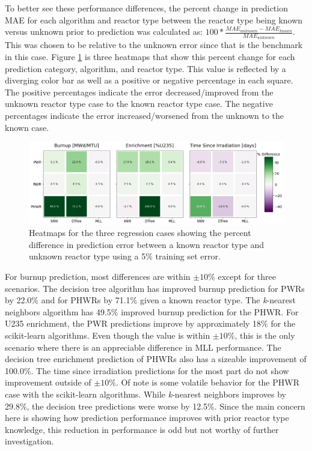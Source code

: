 To better see these performance differences, the percent change in prediction
\gls{MAE} for each algorithm and reactor type between the reactor type being
known versus unknown prior to prediction was calculated as: $100 *
\frac{MAE_{unknown} - MAE_{known}}{MAE_{unknown}}$.  This was chosen to be
relative to the unknown error since that is the benchmark in this case.  Figure
\ref{fig:knownrxtr} is three heatmaps that show this percent change for each
prediction category, algorithm, and reactor type.  This value is reflected by a
diverging color bar as well as a positive or negative percentage in each
square.  The positive percentages indicate the error decreased/improved from
the unknown reactor type case to the known reactor type case.  The negative
percentages indicate the error increased/worsened from the unknown to the known
case. 

\begin{figure}[!htb]
  \centering
  \includegraphics[width=\textwidth]{./chapters/exp1/rxtr-type_known-unknown_diff_err05.png}
  \caption{Heatmaps for the three regression cases showing the percent 
           difference in prediction error between a known reactor type 
           and unknown reactor type using a 5\% training set error.}
  \label{fig:knownrxtr}
\end{figure}

For burnup prediction, most differences are within $\pm10\%$ except for three
scenarios.  The decision tree algorithm has improved burnup prediction for
\gls{PWR}s by 22.0\% and for \gls{PHWR}s by 71.1\% given a known reactor type.
The \textit{k}-nearest neighbors algorithm has 49.5\% improved burnup
prediction for the \gls{PHWR}. For \gls{U235} enrichment, the \gls{PWR}
predictions improve by approximately 18\% for the scikit-learn algorithms.
Even though the value is within $\pm10\%$, this is the only scenario where
there is an appreciable difference in \gls{MLL} performance. The decision tree
enrichment prediction of \gls{PHWR}s also has a sizeable improvement of
100.0\%.  The time since irradiation predictions for the most part do not show
improvement outside of $\pm10\%$. Of note is some volatile behavior for the
\gls{PHWR} case with the scikit-learn algorithms.  While \textit{k}-nearest
neighbors improves by 29.8\%, the decision tree predictions were worse by
12.5\%.  Since the main concern here is showing how prediction performance
improves with prior reactor type knowledge, this reduction in performance is
odd but not worthy of further investigation.

